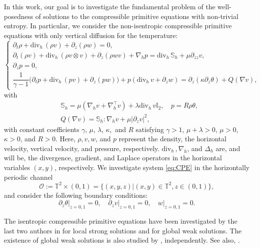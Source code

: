 \documentclass[12pt,reqno]{amsart}
\numberwithin{equation}{section}
\newcommand{\dt}{\partial_t}
\newcommand{\dz}[0]{\partial_z}
\newcommand{\dvh}[0]{\mathrm{div}_{h}\,}
\newcommand{\nablah}[0]{\nabla_{h}}
\newcommand{\deltah}[0]{\Delta_{h}}
\begin{document}
In this work, our goal is to investigate the fundamental problem of the well-posedness of solutions to the compressible primitive equations with non-trivial entropy. In particular, we consider the non-isentropic compressible primitive equations with only vertical diffusion for the temperature:
\begin{equation}\label{eq:CPE}
	\begin{cases}
		\dt \rho + \dvh (\rho v)  + \dz (\rho w) = 0, \\
		\dt (\rho v) + \dvh(\rho v\otimes v) + \dz(\rho w v) + \nablah p = \dvh \mathbb S_h + \mu \partial_{zz} v, \\
		\dz p = 0, \\
		\dfrac{1}{\gamma-1}\bigl(\dt p + \dvh(p v) + \dz (pw) \bigr) + p(\dvh v + \dz w) = \dz (\kappa \dz \theta )+Q(\nabla v),
	\end{cases}
\end{equation}
with
\begin{eqnarray}
	&\mathbb S_h = \mu (\nablah v + \nablah^\top v) + \lambda \dvh v \mathbb I_2, \quad
	p = R \rho \theta, \nonumber\\
  &Q(\nabla v)=\mathbb S_h:\nabla_hv+\mu|\partial_zv|^2,\label{Q}
\end{eqnarray}
with constant coefficients $\gamma$, $\mu$, $\lambda$, $\kappa,$ and $R$ satisfying $\gamma > 1$, $\mu+\lambda>0$, $\mu>0$, $\kappa>0$, and $R>0$.
Here, $ \rho, v, w $, and $ p $ represent the density, the horizontal velocity, vertical velocity, and pressure, respectively. $ \dvh, \nablah $, and $\deltah $ are, and will be, the divergence, gradient, and Laplace operators in the horizontal variables $ (x,y) $, respectively.
We investigate system \eqref{eq:CPE} in the horizontally periodic channel
$$ \mathcal O:= \mathbb T^2 \times (0,1) = \lbrace (x,y,z) | (x,y) \in \mathbb T^2, z \in (0,1) \rbrace,
$$
and consider the following
boundary conditions:
\begin{equation}\label{bc:CPE}
	\dz \theta\big|_{z=0,1} = 0, \quad \dz v\big|_{z=0,1} = 0, \quad w\big|_{z=0,1} = 0.
\end{equation}

The isentropic compressible primitive equations have been investigated by the last two authors in \cite{LT2018a} for local strong solutions and \cite{LT2018b} for global weak solutions. The existence of global weak solutions is also studied by \cite{Wang2020}, independently. See also, \cite{Jiu2018,Ersoy2011a,Ersoy2012,Gatapov2005}.
\end{document}
